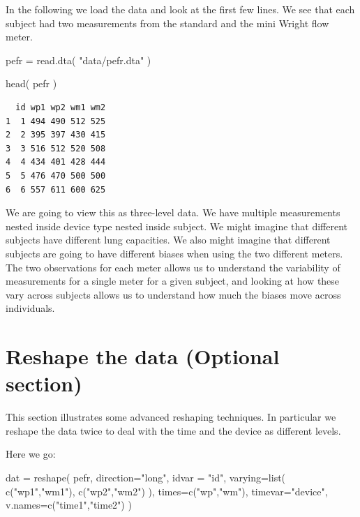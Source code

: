 \documentclass[
  letterpaper,
  DIV=11,
  numbers=noendperiod]{scrreprt}
\newenvironment{Shaded}{\begin{snugshade}}{\end{snugshade}}
\newcommand{\AttributeTok}[1]{\textcolor[rgb]{0.49,0.56,0.16}{#1}}
\newcommand{\FunctionTok}[1]{\textcolor[rgb]{0.02,0.16,0.49}{#1}}
\newcommand{\NormalTok}[1]{\textcolor[rgb]{0.00,0.44,0.13}{#1}}
\newcommand{\OtherTok}[1]{\textcolor[rgb]{0.00,0.44,0.13}{#1}}
\newcommand{\StringTok}[1]{\textcolor[rgb]{0.25,0.44,0.63}{#1}}
\begin{document}
In the following we load the data and look at the first few lines. We
see that each subject had two measurements from the standard and the
mini Wright flow meter.

\begin{Shaded}
\begin{Highlighting}[]
\NormalTok{pefr }\OtherTok{=} \FunctionTok{read.dta}\NormalTok{( }\StringTok{"data/pefr.dta"}\NormalTok{ )}

\FunctionTok{head}\NormalTok{( pefr )}
\end{Highlighting}
\end{Shaded}

\begin{verbatim}
  id wp1 wp2 wm1 wm2
1  1 494 490 512 525
2  2 395 397 430 415
3  3 516 512 520 508
4  4 434 401 428 444
5  5 476 470 500 500
6  6 557 611 600 625
\end{verbatim}

We are going to view this as three-level data. We have multiple
measurements nested inside device type nested inside subject. We might
imagine that different subjects have different lung capacities. We also
might imagine that different subjects are going to have different biases
when using the two different meters. The two observations for each meter
allows us to understand the variability of measurements for a single
meter for a given subject, and looking at how these vary across subjects
allows us to understand how much the biases move across individuals.

\hypertarget{reshape-the-data-optional-section}{%
\section{Reshape the data (Optional
section)}\label{reshape-the-data-optional-section}}

This section illustrates some advanced reshaping techniques. In
particular we reshape the data twice to deal with the time and the
device as different levels.

Here we go:

\begin{Shaded}
\begin{Highlighting}[]
\NormalTok{dat }\OtherTok{=} \FunctionTok{reshape}\NormalTok{( pefr, }\AttributeTok{direction=}\StringTok{"long"}\NormalTok{, }\AttributeTok{idvar =} \StringTok{"id"}\NormalTok{, }
               \AttributeTok{varying=}\FunctionTok{list}\NormalTok{( }\FunctionTok{c}\NormalTok{(}\StringTok{"wp1"}\NormalTok{,}\StringTok{"wm1"}\NormalTok{), }\FunctionTok{c}\NormalTok{(}\StringTok{"wp2"}\NormalTok{,}\StringTok{"wm2"}\NormalTok{) ),}
               \AttributeTok{times=}\FunctionTok{c}\NormalTok{(}\StringTok{"wp"}\NormalTok{,}\StringTok{"wm"}\NormalTok{),}
               \AttributeTok{timevar=}\StringTok{"device"}\NormalTok{,}
               \AttributeTok{v.names=}\FunctionTok{c}\NormalTok{(}\StringTok{"time1"}\NormalTok{,}\StringTok{"time2"}\NormalTok{) )}
\end{Highlighting}
\end{Shaded}
\end{document}
